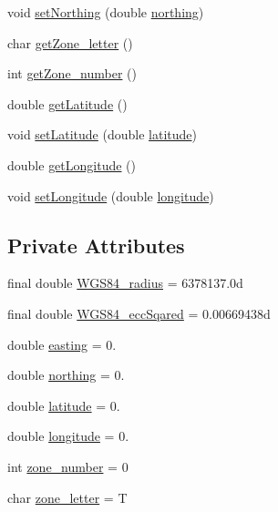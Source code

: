 \begin{DoxyCompactItemize}
\item 
void \hyperlink{classpt_1_1lsts_1_1asa_1_1pos_1_1UTMCoordinates_aec93621f39753a63584ff6f7d70aa3ae}{set\+Northing} (double \hyperlink{classpt_1_1lsts_1_1asa_1_1pos_1_1UTMCoordinates_a67e32d6d5f1e61c42c06ebb06e3223ac}{northing})
\item 
char \hyperlink{classpt_1_1lsts_1_1asa_1_1pos_1_1UTMCoordinates_a055ac34f256ea0936d365e6c2a8601d9}{get\+Zone\+\_\+letter} ()
\item 
int \hyperlink{classpt_1_1lsts_1_1asa_1_1pos_1_1UTMCoordinates_aaeb605008344ef2c5356ba421fdb28b4}{get\+Zone\+\_\+number} ()
\item 
double \hyperlink{classpt_1_1lsts_1_1asa_1_1pos_1_1UTMCoordinates_a3a304305fedc66bab2afe4a467b70d2b}{get\+Latitude} ()
\item 
void \hyperlink{classpt_1_1lsts_1_1asa_1_1pos_1_1UTMCoordinates_aa22e7e64b2c9e9243d8f44a405700748}{set\+Latitude} (double \hyperlink{classpt_1_1lsts_1_1asa_1_1pos_1_1UTMCoordinates_aad153e29fa181fa437b3dbdb493651fd}{latitude})
\item 
double \hyperlink{classpt_1_1lsts_1_1asa_1_1pos_1_1UTMCoordinates_a49f23c920d7fc238391a75a7d79f2a04}{get\+Longitude} ()
\item 
void \hyperlink{classpt_1_1lsts_1_1asa_1_1pos_1_1UTMCoordinates_a89481f141d1f78f8d1fdb6535f9104f6}{set\+Longitude} (double \hyperlink{classpt_1_1lsts_1_1asa_1_1pos_1_1UTMCoordinates_a408c6bf75745de5c290f77e65948ea2d}{longitude})
\end{DoxyCompactItemize}
\subsection*{Private Attributes}
\begin{DoxyCompactItemize}
\item 
final double \hyperlink{classpt_1_1lsts_1_1asa_1_1pos_1_1UTMCoordinates_a4831382346b13b053880be4b8fecb8db}{W\+G\+S84\+\_\+radius} = 6378137.\+0d
\item 
final double \hyperlink{classpt_1_1lsts_1_1asa_1_1pos_1_1UTMCoordinates_a9e95f9f1c3337f24dd6b4a1b08479559}{W\+G\+S84\+\_\+ecc\+Sqared} = 0.\+00669438d
\item 
double \hyperlink{classpt_1_1lsts_1_1asa_1_1pos_1_1UTMCoordinates_a508f46c459b0b1eacb4d7949412e8603}{easting} = 0.
\item 
double \hyperlink{classpt_1_1lsts_1_1asa_1_1pos_1_1UTMCoordinates_a67e32d6d5f1e61c42c06ebb06e3223ac}{northing} = 0.
\item 
double \hyperlink{classpt_1_1lsts_1_1asa_1_1pos_1_1UTMCoordinates_aad153e29fa181fa437b3dbdb493651fd}{latitude} = 0.
\item 
double \hyperlink{classpt_1_1lsts_1_1asa_1_1pos_1_1UTMCoordinates_a408c6bf75745de5c290f77e65948ea2d}{longitude} = 0.
\item 
int \hyperlink{classpt_1_1lsts_1_1asa_1_1pos_1_1UTMCoordinates_a90bf03e81ee88041f7831e0b6a6bc08c}{zone\+\_\+number} = 0
\item 
char \hyperlink{classpt_1_1lsts_1_1asa_1_1pos_1_1UTMCoordinates_a8677ce9f27943bc0beec8797559338a5}{zone\+\_\+letter} = \textquotesingle{}T\textquotesingle{}
\end{DoxyCompactItemize}


